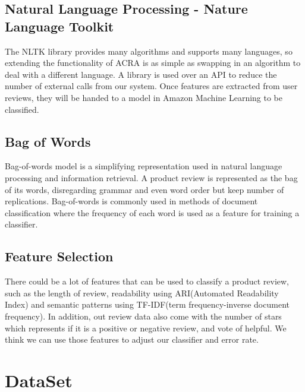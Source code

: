 \documentclass[a4paper]{article}
\begin{document}
\subsection{Natural Language Processing - Nature Language Toolkit}
The NLTK library provides many algorithms and supports many languages, so extending the functionality of ACRA is as simple as swapping in an algorithm to deal with a different language. A library is used over an API to reduce the number of external calls from our system. Once features are extracted from user reviews, they will be handed to a model in Amazon Machine Learning to be classified.

\subsection{Bag of Words}
Bag-of-words model is a simplifying representation used in natural language processing and information retrieval. A product review is represented as the bag of its words, disregarding grammar and even word order but keep number of replications. Bag-of-words is commonly used in methods of document classification where the frequency of each word is used as a feature for training a classifier.

\subsection{Feature Selection}
There could be a lot of features that can be used to classify a product review, such as the length of review, readability using ARI(Automated Readability Index) and semantic patterns using TF-IDF(term frequency-inverse document frequency). In addition, out review data also come with the number of stars which represents if it is a positive or negative review, and vote of helpful. We think we can use those features to adjust our classifier and error rate.

\section{DataSet}
\end{document}
